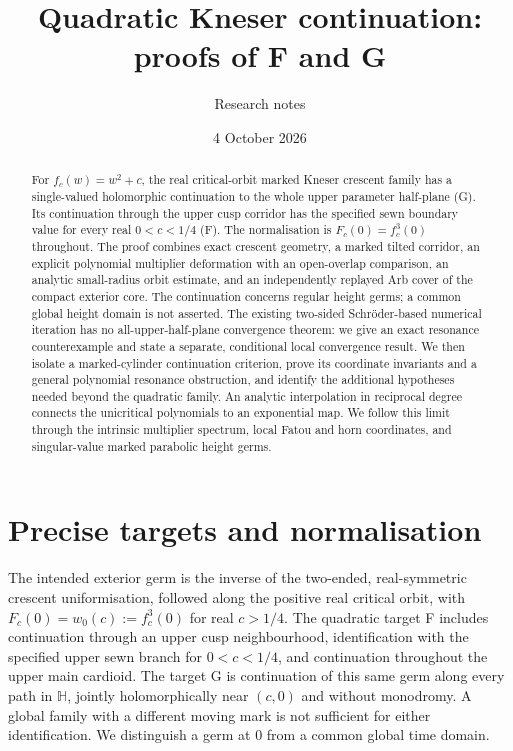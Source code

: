 \documentclass[11pt]{article}
\title{Quadratic Kneser continuation: proofs of F and G}
\author{Research notes}
\date{4 October 2026}
\newcommand{\HH}{\mathbb H}
\begin{document}
\maketitle
\begin{abstract}
For $f_c(w)=w^2+c$, the real critical-orbit marked Kneser crescent family
has a single-valued holomorphic continuation to the whole upper parameter
half-plane (G). Its continuation through the upper cusp corridor has the
specified sewn boundary value for every real $0<c<1/4$ (F).
The normalisation is $F_c(0)=f_c^3(0)$ throughout.
The proof combines exact crescent geometry, a marked tilted corridor,
an explicit polynomial multiplier deformation with an open-overlap
comparison, an analytic small-radius orbit estimate, and an independently
replayed Arb cover of the compact exterior core. The continuation concerns
regular height germs; a common global height domain is not asserted.
The existing two-sided Schr\"oder-based numerical iteration has no
all-upper-half-plane convergence theorem: we give an exact resonance
counterexample and state a separate, conditional local convergence result.
We then isolate a marked-cylinder continuation criterion, prove its
coordinate invariants and a general polynomial resonance obstruction,
and identify the additional hypotheses needed beyond the quadratic family.
An analytic interpolation in reciprocal degree connects the unicritical
polynomials to an exponential map. We follow this limit through the
intrinsic multiplier spectrum, local Fatou and horn coordinates, and
singular-value marked parabolic height germs.
\end{abstract}

\section{Precise targets and normalisation}
The intended exterior germ is the inverse of the two-ended, real-symmetric
crescent uniformisation, followed along the positive real critical orbit,
with $F_c(0)=w_0(c):=f_c^3(0)$ for real $c>1/4$.
The quadratic target F includes continuation through an upper cusp
neighbourhood, identification with the specified upper sewn branch for
$0<c<1/4$, and continuation throughout the upper main cardioid.
The target G is continuation of this same germ along every path in $\HH$,
jointly holomorphically near $(c,0)$ and without monodromy. A global family
with a different moving mark is not sufficient for either identification.
We distinguish a germ at $0$ from a common global time domain.
\end{document}
